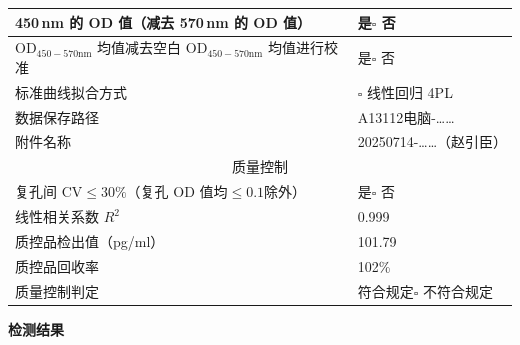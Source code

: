\documentclass[UTF8,10pt,a4paper,fontset=fandol]{ctexart}
\newcommand{\fieldvalue}[1]{#1}
\newcommand{\handwritten}[1]{#1}
\begin{document}
\begin{tabular}{|p{}|p{}|}
\hline
450\,nm 的 OD 值（减去 570\,nm 的 OD 值） &
\fieldvalue{是}\quad $\square$ 否
\\ \hline
OD$_{450-570\text{nm}}$ 均值减去空白 OD$_{450-570\text{nm}}$ 均值进行校准 &
\fieldvalue{是}\quad $\square$ 否
\\ \hline
标准曲线拟合方式 &
$\square$ 线性回归\quad
\fieldvalue{4PL}
\\ \hline
数据保存路径 &
\fieldvalue{\handwritten{A13112电脑-……}}
\\ \hline
附件名称 &
\fieldvalue{\handwritten{20250714-……（赵引臣）}}
\\ \hline
\multicolumn{2}{|c|}{质量控制} \\ \hline
复孔间 CV$\leq 30\%$（复孔 OD 值均$\leq 0.1$除外） &
\fieldvalue{是}\quad $\square$ 否
\\ \hline
线性相关系数 $R^2$ &
\fieldvalue{\handwritten{0.999}}
\\ \hline
质控品检出值（pg/ml） &
\fieldvalue{\handwritten{101.79}}
\\ \hline
质控品回收率 &
\fieldvalue{\handwritten{102\%}}
\\ \hline
质量控制判定 &
\fieldvalue{符合规定}\quad $\square$ 不符合规定
\\ \hline
\end{tabular}

\vspace{0.5em}

\begin{center}
\textbf{检测结果}
\end{center}
\end{document}
